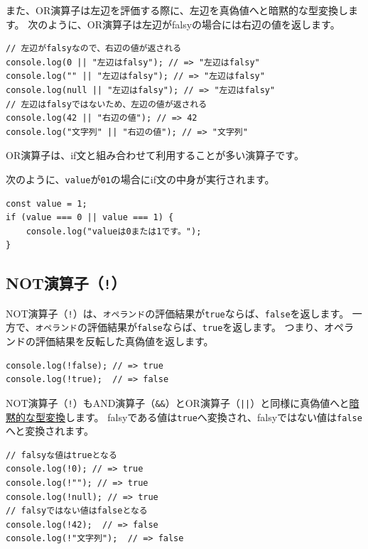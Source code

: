また、OR演算子は左辺を評価する際に、左辺を真偽値へと暗黙的な型変換します。
次のように、OR演算子は左辺がfalsyの場合には右辺の値を返します。

\begin{lstlisting}
// 左辺がfalsyなので、右辺の値が返される
console.log(0 || "左辺はfalsy"); // => "左辺はfalsy"
console.log("" || "左辺はfalsy"); // => "左辺はfalsy"
console.log(null || "左辺はfalsy"); // => "左辺はfalsy"
// 左辺はfalsyではないため、左辺の値が返される
console.log(42 || "右辺の値"); // => 42
console.log("文字列" || "右辺の値"); // => "文字列"
\end{lstlisting}

OR演算子は、if文と組み合わせて利用することが多い演算子です。

次のように、\texttt{value}が\texttt{0}\textbf{}\texttt{1}の場合にif文の中身が実行されます。

\begin{lstlisting}
const value = 1;
if (value === 0 || value === 1) {
    console.log("valueは0または1です。");
}
\end{lstlisting}

\hypertarget{not-operator}{%
\subsection{NOT演算子（\texttt{!}）}\label{not-operator}}

NOT演算子（\texttt{!}）は、\texttt{オペランド}の評価結果が\texttt{true}ならば、\texttt{false}を返します。
一方で、\texttt{オペランド}の評価結果が\texttt{false}ならば、\texttt{true}を返します。
つまり、オペランドの評価結果を反転した真偽値を返します。

\begin{lstlisting}
console.log(!false); // => true
console.log(!true);  // => false
\end{lstlisting}

NOT演算子（\texttt{!}）もAND演算子（\texttt{\&\&}）とOR演算子（\texttt{||}）と同様に真偽値へと\hyperlink{implicit-coercion}{暗黙的な型変換}します。
falsyである値は\texttt{true}へ変換され、falsyではない値は\texttt{false}へと変換されます。

\begin{lstlisting}
// falsyな値はtrueとなる
console.log(!0); // => true
console.log(!""); // => true
console.log(!null); // => true
// falsyではない値はfalseとなる
console.log(!42);  // => false
console.log(!"文字列");  // => false
\end{lstlisting}

